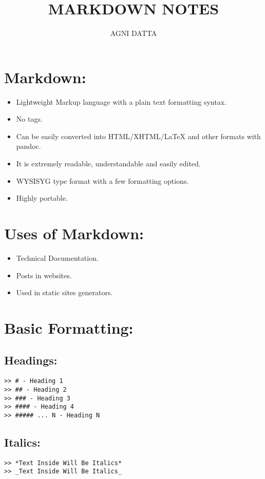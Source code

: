\documentclass[12pt,british]{article}
\begin{document}
\title{\textbf{MARKDOWN NOTES}}
\author{AGNI DATTA}

\maketitle
\tableofcontents{}

\newpage{}

\section{Markdown:}
\begin{itemize}
\item Lightweight Markup language with a plain text formatting syntax.
\item No tags. 
\item Can be easily converted into HTML/XHTML/\LaTeX\: and other formats
with pandoc.
\item It is extremely readable, understandable and easily edited.
\item WYSISYG type format with a few formatting options.
\item Highly portable.
\end{itemize}

\section{Uses of Markdown:}
\begin{itemize}
\item Technical Documentation.
\item Posts in websites.
\item Used in static sites generators.
\end{itemize}

\section{Basic Formatting:}

\subsection{Headings:}
\begin{verbatim}
>> # - Heading 1
>> ## - Heading 2
>> ### - Heading 3
>> #### - Heading 4
>> ##### ... N - Heading N
\end{verbatim}

\subsection{Italics:}
\begin{verbatim}
>> *Text Inside Will Be Italics*
>> _Text Inside Will Be Italics_
\end{verbatim}
\end{document}
